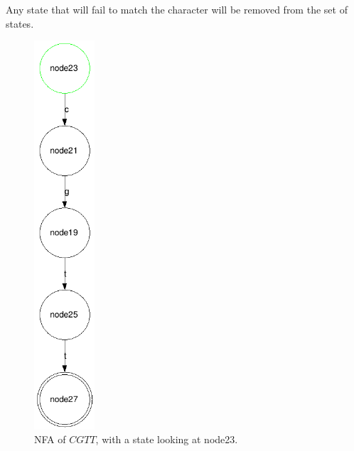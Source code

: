 Any state that will fail to match the character will be removed from the set of states.
\begin{figure}[h!]
  \centering
\begin{minipage}[b]{0.40\linewidth}
  \centering
      \includegraphics[width=0.2\textwidth]{lib/cgtt1.png}
    \caption{NFA of $CGTT$, with a state looking at node23.\\}
    \label{fig:CGTT_1}
  \end{minipage}
\begin{minipage}[b]{0.40\linewidth}
\centering

\end{minipage}
\end{figure}
